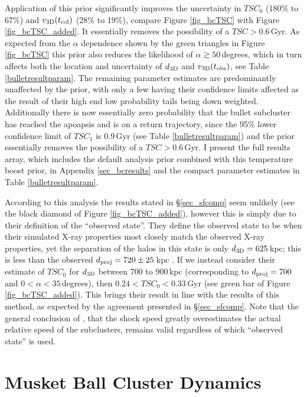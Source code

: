 \documentclass[12pt]{emulateapj}
\begin{document}
Application of this prior significantly improves the uncertainty in $TSC_0$ (180\% to 67\%)  and $v_{\rm 3D}(t_{\rm col})$ (28\% to 19\%), compare Figure \ref{fig_bcTSC} with Figure \ref{fig_bcTSC_added}.
It essentially removes the possibility of a $TSC > 0.6$\,Gyr.
As expected from the $\alpha$ dependence shown by the green triangles in Figure \ref{fig_bcTSC} this prior also reduces the likelihood of $\alpha \gtrsim 50$\,degrees, which in turn affects both the location and uncertainty of $d_{\rm3D}$ and $v_{\rm 3D}(t_{\rm obs})$, see Table \ref{bulletresultparam}. 
The remaining parameter estimates are predominantly unaffected by the prior, with only a few having their confidence limits affected as the result of their high end low probability tails being down weighted.
Additionally there is now essentially zero probability that the bullet subcluster has reached the apoapsis and is on a return trajectory, since the 95\% lower confidence limit of $TSC_1$ is 0.9\,Gyr (see Table \ref{bulletresultparam}) and the prior essentially removes the possibility of a $TSC > 0.6$\,Gyr.
I present the full results array, which includes the default analysis prior combined with this temperature boost prior, in Appendix \ref{sec_bcresults} and the compact parameter estimates in Table \ref{bulletresultparam}.

According to this analysis the \citet{Springel:2007bg} results stated in \S\ref{sec_sfcomp} seem unlikely (see the black diamond of Figure \ref{fig_bcTSC_added}), however this is simply due to their definition of the ``observed state''.
They define the observed state to be when their simulated X-ray properties most closely match the observed X-ray properties, yet the separation of the halos in this state is only $d_{\rm 3D}=625$\,kpc; this is less than the observed $d_{\rm proj} = 720\pm 25$\,kpc \citep{Bradac:2006be}.
If we instead consider their estimate of $TSC_0$ for $d_{\rm 3D}$ between 700 to 900\,kpc (corresponding to  $d_{\rm proj} = 700$ and $0<\alpha<35$\,degrees), then $0.24<TSC_0<0.33$\,Gyr (see green bar of Figure \ref{fig_bcTSC_added}).
This brings their result in line with the results of this method, as expected by the agreement presented in \S\ref{sec_sfcomp}.
Note that the general conclusion of \citet{Springel:2007bg}, that the  shock speed greatly overestimates the actual relative speed of the subclusters, remains valid regardless of which ``observed state'' is used.

\section{Musket Ball Cluster Dynamics}\label{sec_musketball}
\end{document}
